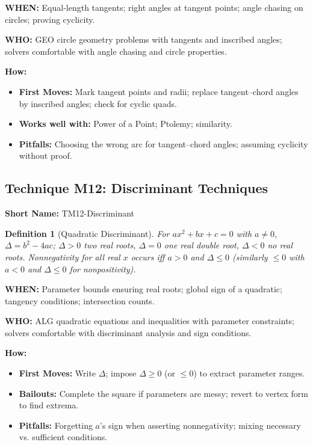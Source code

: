 \documentclass[12pt]{article}
\newtheorem{definition}{Definition}[section]
\begin{document}
\textbf{WHEN:} Equal-length tangents; right angles at tangent points; angle chasing on circles; proving cyclicity.

\textbf{WHO:} GEO circle geometry problems with tangents and inscribed angles; solvers comfortable with angle chasing and circle properties.

\textbf{How:}
\begin{itemize}
    \item \textbf{First Moves:} Mark tangent points and radii; replace tangent–chord angles by inscribed angles; check for cyclic quads.
    \item \textbf{Works well with:} Power of a Point; Ptolemy; similarity.
    \item \textbf{Pitfalls:} Choosing the wrong arc for tangent–chord angles; assuming cyclicity without proof.
\end{itemize}

\subsection{Technique M12: Discriminant Techniques}
\textbf{Short Name:} TM12-Discriminant

\begin{definition}[Quadratic Discriminant]
For $ax^2+bx+c=0$ with $a\neq 0$, $\Delta=b^2-4ac$; $\Delta>0$ two real roots, $\Delta=0$ one real double root, $\Delta<0$ no real roots. Nonnegativity for all real $x$ occurs iff $a>0$ and $\Delta\le 0$ (similarly $\le 0$ with $a<0$ and $\Delta\le 0$ for nonpositivity).
\end{definition}

\textbf{WHEN:} Parameter bounds ensuring real roots; global sign of a quadratic; tangency conditions; intersection counts.

\textbf{WHO:} ALG quadratic equations and inequalities with parameter constraints; solvers comfortable with discriminant analysis and sign conditions.

\textbf{How:}
\begin{itemize}
    \item \textbf{First Moves:} Write $\Delta$; impose $\Delta\ge 0$ (or $\le 0$) to extract parameter ranges.
    \item \textbf{Bailouts:} Complete the square if parameters are messy; revert to vertex form to find extrema.
    \item \textbf{Pitfalls:} Forgetting $a$'s sign when asserting nonnegativity; mixing necessary vs. sufficient conditions.
\end{itemize}
\end{document}
